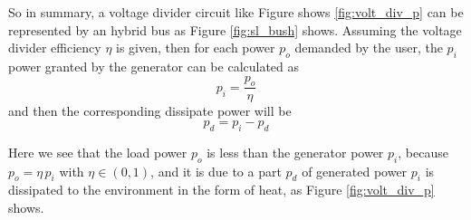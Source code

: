 \documentclass[11pt, a4paper]{article}
\theoremstyle{definition}
\theoremstyle{plain}
\theoremstyle{plain}
\theoremstyle{remark}
\theoremstyle{remark}
\theoremstyle{remark}
\begin{document}
{	
	
	So in summary, a voltage divider circuit like Figure shows \ref{fig:volt_div_p} can be represented by an hybrid bus as Figure \ref{fig:sl_bush} shows. Assuming the voltage divider efficiency $\eta$ is given, then for each power $ p_o $ demanded by the user, the $ p_i $ power granted by the generator can be calculated as
	\[
	p_i = \frac{p_o}{\eta}
	\]
	and then the corresponding dissipate power will be
	\[ 
	p_d = p_i - p_d \] 
	
	
	Here we see that the load power $ p_o $ is less than the generator power $ p_i $, because $p_o = \eta\, p_i$ with $\eta\in (0, 1)$, and it is due to a part $ p_d $ of generated power $ p_i $ is dissipated to the environment in the form of heat, as Figure \ref{fig:volt_div_p} shows.
	
	
	
}
\end{document}
